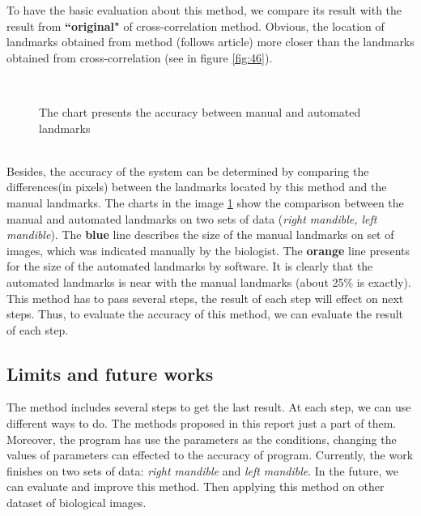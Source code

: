To have the basic evaluation about this method, we compare its result with the result from \textbf{``original"} of cross-correlation method. Obvious, the location of landmarks obtained from method (follows article) more closer than the landmarks obtained from cross-correlation (see in figure \ref{fig:46}).\\
\begin{figure}[h!]
\centering
{}~~
\caption{The chart presents the accuracy between manual and automated landmarks}
\label{fig:47}
\end{figure}~\\
Besides, the accuracy of the system can be determined by comparing the differences(in pixels) between the landmarks located by this method and the manual landmarks. The charts in the image \ref{fig:47} show the comparison between the manual and automated landmarks on two sets of data (\textit{right mandible, left mandible}). The \textbf{blue} line describes the size of the manual landmarks on set of images, which was indicated manually by the biologist. The \textbf{orange} line presents for the size of the automated landmarks by software. It is clearly that the automated landmarks is near with the manual landmarks (about 25\% is exactly). This method has to pass several steps, the result of each step will effect on next steps. Thus, to evaluate the accuracy of this method, we can evaluate the result of each step.
\subsection{Limits and future works}
The method includes several steps to get the last result. At each step, we can use different ways to do. The methods proposed in this report just a part of them. Moreover, the program has use the parameters as the conditions, changing the values of parameters can effected to the accuracy of program.
Currently, the work finishes on two sets of data: \textit{right mandible} and \textit{left mandible}. In the future, we can evaluate and improve this method. Then applying this method on other dataset of biological images.